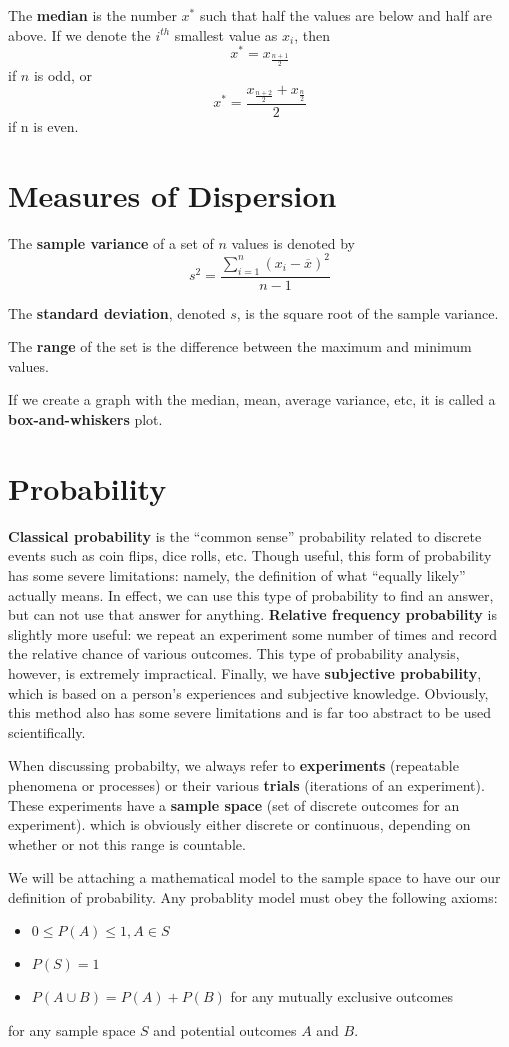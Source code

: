 \documentclass[12pt]{article}
\begin{document}
The {\bf median} is the number $x^*$ such that half the values are below and half are above. If we denote the $i^{th}$ smallest value as $x_i$, then \[ x^* = x_{\frac{n+1}{2}} \] if $n$ is odd, or \[ x^* = \frac{x_{\frac{n+2}{2}} + x_\frac{n}{2}}{2} \] if n is even.

\section*{Measures of Dispersion}
The {\bf sample variance} of a set of $n$ values is denoted by \[ s^2 = \frac{\displaystyle\sum_{i=1}^n (x_i - \overline{x})^2}{n-1} \]

The {\bf standard deviation}, denoted $s$, is the square root of the sample variance.

The {\bf range} of the set is the difference between the maximum and minimum values.

If we create a graph with the median, mean, average variance, etc, it is called a {\bf box-and-whiskers} plot.

\section*{Probability}
{\bf Classical probability} is the ``common sense'' probability related to discrete events such as coin flips, dice rolls, etc. Though useful, this form of probability has some severe limitations: namely, the definition of what ``equally likely'' actually means. In effect, we can use this type of probability to find an answer, but can not use that answer for anything. {\bf Relative frequency probability} is slightly more useful: we repeat an experiment some number of times and record the relative chance of various outcomes. This type of probability analysis, however, is extremely impractical. Finally, we have {\bf subjective probability}, which is based on a person's experiences and subjective knowledge. Obviously, this method also has some severe limitations and is far too abstract to be used scientifically.

When discussing probabilty, we always refer to {\bf experiments} (repeatable phenomena or processes) or their various {\bf trials} (iterations of an experiment). These experiments have a {\bf sample space} (set of discrete outcomes for an experiment). which is obviously either discrete or continuous, depending on whether or not this range is countable.

We will be attaching a mathematical model to the sample space to have our our definition of probability. Any probablity model must obey the following axioms:
\begin{itemize}
\item $0 \leq P(A) \leq 1, A \in S$
\item $P(S) = 1$
\item $P(A \cup B) = P(A) + P(B)$ for any mutually exclusive outcomes
\end{itemize}
for any sample space $S$ and potential outcomes $A$ and $B$.
\end{document}
